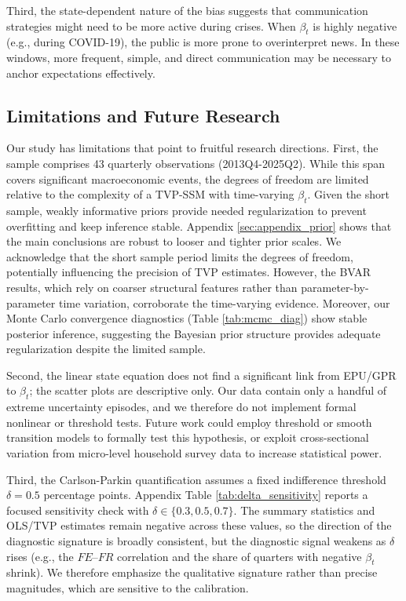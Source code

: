 \documentclass[12pt]{article}
\begin{document}
Third, the state-dependent nature of the bias suggests that communication strategies might need to be more active during crises. When $\beta_t$ is highly negative (e.g., during COVID-19), the public is more prone to overinterpret news. In these windows, more frequent, simple, and direct communication may be necessary to anchor expectations effectively.

\subsection{Limitations and Future Research}
Our study has limitations that point to fruitful research directions. First, the sample comprises 43 quarterly observations (2013Q4-2025Q2). While this span covers significant macroeconomic events, the degrees of freedom are limited relative to the complexity of a TVP-SSM with time-varying $\beta_t$. Given the short sample, weakly informative priors provide needed regularization to prevent overfitting and keep inference stable. Appendix \ref{sec:appendix_prior} shows that the main conclusions are robust to looser and tighter prior scales. We acknowledge that the short sample period limits the degrees of freedom, potentially influencing the precision of TVP estimates. However, the BVAR results, which rely on coarser structural features rather than parameter-by-parameter time variation, corroborate the time-varying evidence. Moreover, our Monte Carlo convergence diagnostics (Table \ref{tab:mcmc_diag}) show stable posterior inference, suggesting the Bayesian prior structure provides adequate regularization despite the limited sample.

Second, the linear state equation does not find a significant link from EPU/GPR to $\beta_t$; the scatter plots are descriptive only. Our data contain only a handful of extreme uncertainty episodes, and we therefore do not implement formal nonlinear or threshold tests. Future work could employ threshold or smooth transition models to formally test this hypothesis, or exploit cross-sectional variation from micro-level household survey data to increase statistical power.

Third, the Carlson-Parkin quantification assumes a fixed indifference threshold $\delta=0.5$ percentage points. Appendix Table \ref{tab:delta_sensitivity} reports a focused sensitivity check with $\delta \in \{0.3, 0.5, 0.7\}$. The summary statistics and OLS/TVP estimates remain negative across these values, so the direction of the diagnostic signature is broadly consistent, but the diagnostic signal weakens as $\delta$ rises (e.g., the $FE$--$FR$ correlation and the share of quarters with negative $\beta_t$ shrink). We therefore emphasize the qualitative signature rather than precise magnitudes, which are sensitive to the calibration.
\end{document}
